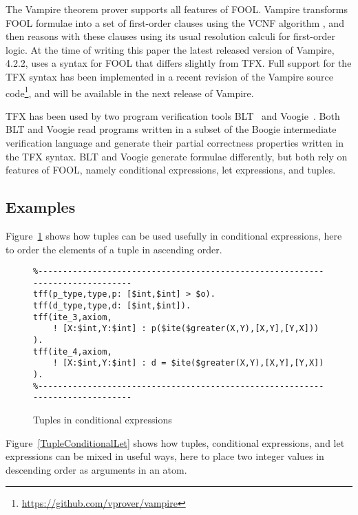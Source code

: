 \documentclass{easychair}
\begin{document}
The Vampire theorem prover \cite{KV13} supports all features of FOOL. 
Vampire transforms FOOL formulae into a set of first-order clauses using the 
VCNF algorithm \cite{KK+16-GCAI}, and then reasons with these clauses using 
its usual resolution calculi for first-order logic. 
At the time of writing this paper the latest released version of Vampire,
4.2.2, uses a syntax for FOOL that differs slightly from TFX. 
Full support for the TFX syntax has been implemented in a recent revision of 
the Vampire source code\footnote{%
\url{https://github.com/vprover/vampire}}, and will be available
in the next release of Vampire.

TFX has been used by two program verification tools BLT~\cite{CF17} and
Voogie~\cite{KKV18}. 
Both BLT and Voogie read programs written in a subset of the Boogie 
intermediate verification language and generate their partial correctness 
properties written in the TFX syntax. 
BLT and Voogie generate formulae differently, but both rely on features of 
FOOL, namely conditional expressions, let expressions, and tuples.

\subsection{Examples}
\label{Examples}

Figure~\ref{TupleConditional} shows how tuples can be used usefully in 
conditional expressions, here to order the elements of a tuple in ascending
order.

\begin{figure}[htbp]
\begin{small}
\begin{verbatim}
%------------------------------------------------------------------------------
tff(p_type,type,p: [$int,$int] > $o).
tff(d_type,type,d: [$int,$int]).
tff(ite_3,axiom,
    ! [X:$int,Y:$int] : p($ite($greater(X,Y),[X,Y],[Y,X])) ).
tff(ite_4,axiom,
    ! [X:$int,Y:$int] : d = $ite($greater(X,Y),[X,Y],[Y,X]) ).
%------------------------------------------------------------------------------
\end{verbatim}
\end{small}
\caption{Tuples in conditional expressions}
\label{TupleConditional}
\end{figure}

Figure~\ref{TupleConditionalLet} shows how tuples, conditional expressions, 
and let expressions can be mixed in useful ways, here to place two integer
values in descending order as arguments in an atom.
\end{document}
